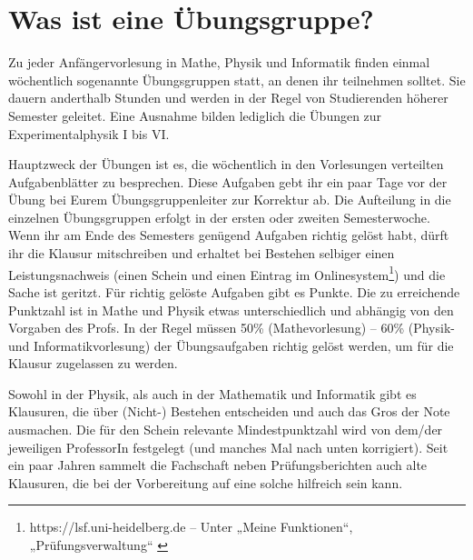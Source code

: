 \section{Was ist eine Übungsgruppe?}

Zu jeder Anfängervorlesung in Mathe, Physik und Informatik finden einmal wöchentlich sogenannte Übungsgruppen statt, an denen ihr teilnehmen solltet. Sie dauern anderthalb Stunden und werden in der Regel von Studierenden höherer Semester geleitet. Eine Ausnahme bilden lediglich die Übungen zur Experimentalphysik I bis VI.

Hauptzweck der Übungen ist es, die wöchentlich in den Vorlesungen verteilten Aufgabenblätter zu besprechen. Diese Aufgaben gebt ihr ein paar Tage vor der Übung bei Eurem Übungsgruppenleiter zur Korrektur ab. Die Aufteilung in die einzelnen Übungsgruppen erfolgt in der ersten oder zweiten Semesterwoche. Wenn ihr am Ende des Semesters genügend Aufgaben richtig gelöst habt, dürft ihr die Klausur mitschreiben und erhaltet bei Bestehen selbiger einen Leistungsnachweis (einen Schein und einen Eintrag im Onlinesystem\footnote{https://lsf.uni-heidelberg.de -- Unter „Meine Funktionen“, „Prüfungsverwaltung“ \label{fn:hispos}}) und die Sache ist geritzt. Für richtig gelöste Aufgaben gibt es Punkte. Die zu erreichende Punktzahl ist in Mathe und Physik etwas unterschiedlich und abhängig von den Vorgaben des Profs. In der Regel müssen 50\% (Mathevorlesung) -- 60\% (Physik- und Informatikvorlesung) der Übungsaufgaben richtig gelöst werden, um für die Klausur zugelassen zu werden.

Sowohl in der Physik, als auch in der Mathematik und Informatik gibt es Klausuren, die über (Nicht-) Bestehen entscheiden und auch das Gros der Note ausmachen. Die für den Schein relevante Mindestpunktzahl wird von dem/der jeweiligen ProfessorIn festgelegt (und manches Mal nach unten korrigiert). Seit ein paar Jahren sammelt die Fachschaft neben Prüfungsberichten auch alte Klausuren, die bei der Vorbereitung auf eine solche hilfreich sein kann.

